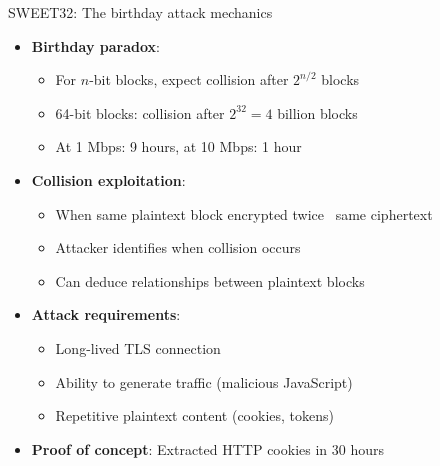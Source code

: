 \documentclass[aspectratio=169, lualatex, handout]{beamer}
\begin{document}
\begin{frame}{SWEET32: The birthday attack mechanics}
	\begin{itemize}[<+->]
		\item \textbf{Birthday paradox}:
		      \begin{itemize}
			      \item For $n$-bit blocks, expect collision after $2^{n/2}$ blocks
			      \item 64-bit blocks: collision after $2^{32} = 4$ billion blocks
			      \item At 1 Mbps: 9 hours, at 10 Mbps: 1 hour
		      \end{itemize}
		\item \textbf{Collision exploitation}:
		      \begin{itemize}
			      \item When same plaintext block encrypted twice \rightarrow\ same ciphertext
			      \item Attacker identifies when collision occurs
			      \item Can deduce relationships between plaintext blocks
		      \end{itemize}
		\item \textbf{Attack requirements}:
		      \begin{itemize}
			      \item Long-lived TLS connection
			      \item Ability to generate traffic (malicious JavaScript)
			      \item Repetitive plaintext content (cookies, tokens)
		      \end{itemize}
		\item \textbf{Proof of concept}: Extracted HTTP cookies in 30 hours
	\end{itemize}
\end{frame}
\end{document}
